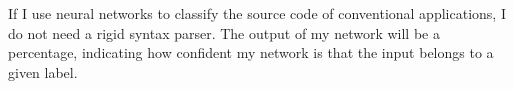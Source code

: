 If I use neural networks to classify the source code of conventional applications, I do not need a rigid syntax parser.
The output of my network will be a percentage, indicating how confident my network is that the input belongs to a given label.



%
%
